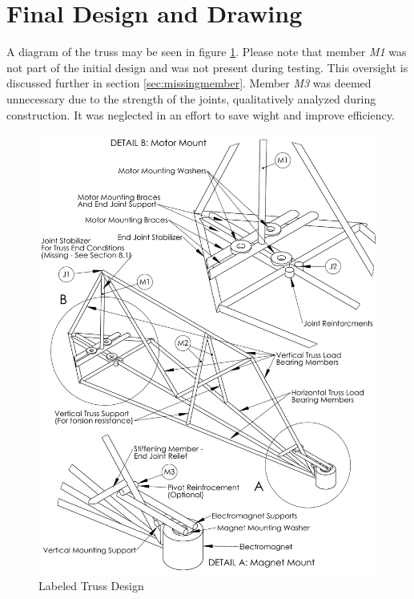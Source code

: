 \section{Final Design and Drawing}

A diagram of the truss may be seen in figure \ref{fig:diagram}. 
Please note that member \emph{M1} was not part of the initial design and was not present during testing.
This oversight is discussed further in section \ref{sec:missingmember}.
Member \emph{M3} was deemed unnecessary due to the strength of the joints, qualitatively analyzed during construction.
It was neglected in an effort to save wight and improve efficiency.



\begin{figure}[p]
    \label{fig:diagram}
    \centering
    \includegraphics[width=.95\textwidth]{images/LabeledDrawing}
    \caption{Labeled Truss Design}
\end{figure}
